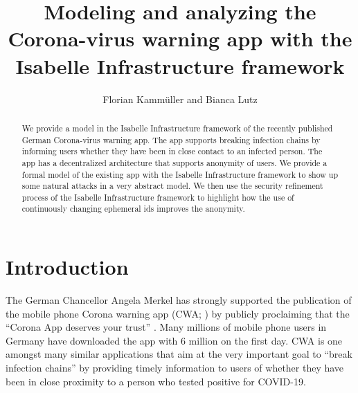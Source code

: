 \documentclass{llncs}
\begin{document}
\frontmatter
  
\mainmatter
\title{Modeling and analyzing the Corona-virus warning app with the Isabelle Infrastructure framework}
\author{Florian Kamm\"uller and Bianca Lutz}

\maketitle
\begin{abstract}
We provide a model in the Isabelle Infrastructure framework of the recently published German
Corona-virus warning app. The app supports breaking infection chains by informing users
whether they have been in close contact to an infected person. The app has a decentralized
architecture that supports anonymity of users.
We provide a formal model of the existing app with the Isabelle Infrastructure framework
to show up some natural attacks in a very abstract model. We then use the security
refinement process of the Isabelle Infrastructure framework to highlight how the use of
continuously changing ephemeral ids improves the anonymity.
\end{abstract}

\section{Introduction}
\label{sec:intro}
The German Chancellor Angela Merkel has strongly supported the publication of
the mobile phone Corona warning app (CWA; \cite{cwa:github}) by publicly proclaiming that the ``Corona
App deserves your trust'' \cite{bundes:20}. Many millions of mobile phone users
in Germany have downloaded the app with 6 million on the first day.
CWA is one amongst many similar applications that aim at the very important goal
to ``break infection chains'' by providing timely information to users of whether they
have been in close proximity to a person who tested positive for COVID-19.
\end{document}
